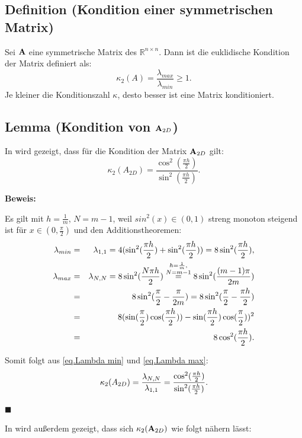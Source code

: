 \subsection{Definition (Kondition einer symmetrischen Matrix)}\label{ss.Definition Kondition einer Matrix}

Sei ${\textbf{A}}$ eine symmetrische Matrix des $\mathbb{R}^{n \times n}$. Dann ist die euklidische Kondition der Matrix definiert als:
\begin{equation}
\kappa_{2} (A) = \frac {\lambda_{max}} {\lambda_{min}} \ge 1.\label{eq.Kondition}
\end{equation}
Je kleiner die Konditionszahl $\kappa$, desto besser ist eine Matrix konditioniert.

\subsection{Lemma (Kondition von ${\textbf{A}}_{2D}$)}\label{ss.Matrixkondition}

In \cite{DR2} wird gezeigt, dass für die Kondition der Matrix ${\textbf{A}}_{2D}$ gilt:
\begin{equation}
\kappa_{2} (A_{2D}) = \frac {\cos^{2}(\frac{\pi h}{2})} {\sin^{2}(\frac{\pi h}{2})}.
\end{equation}

\textbf{Beweis:}

Es gilt mit $h = \frac{1}{m}$, $N = m - 1$, weil $sin^{2}(x) \in (0,1)$ streng monoton steigend ist für $x \in (0,\frac{\pi}{2})$ und den Additionstheoremen:
\begin{eqnarray}
\lambda_{min} &=& \lambda_{1,1} = 4 (\sin^{2}(\frac{\pi h}{2}) + \sin^{2}(\frac{\pi h}{2})) = 8\sin^{2}(\frac{\pi h}{2}),\label{eq.Lambda min}\\
\lambda_{max} &=& \lambda_{N,N} = 8\sin^{2}(\frac{N\pi h}{2}) \overset{\substack{h=\frac {1} {m}, \\N=m-1}}{=} 8\sin^{2}(\frac{(m-1)\pi}{2m}) \notag \\
&=& 8\sin^{2}(\frac{\pi}{2} - \frac{\pi}{2m}) = 8\sin^{2}(\frac{\pi}{2} - \frac{\pi h}{2}) \notag \\
&=& 8(\sin(\frac{\pi}{2})\cos(\frac{\pi h}{2})) - \sin(\frac{\pi h}{2})\cos(\frac{\pi}{2}))^{2} \notag \\
&=& 8\cos^{2}(\frac{\pi h}{2}). \label{eq.Lambda max}
\end{eqnarray}

Somit folgt aus \autoref{eq.Lambda min} und \autoref{eq.Lambda max}:
\begin{equation}
\kappa_{2} (A_{2D}) = \frac {\lambda_{N,N}} {\lambda_{1,1}} = \frac {\cos^{2} (\frac {\pi h} {2})} {\sin^{2} (\frac {\pi h} {2})}. \notag
\end{equation}
\begin{flushright}
$\blacksquare$
\end{flushright}
In \cite{DR3} wird außerdem gezeigt, dass sich $\kappa_{2}({\textbf{A}}_{2D})$ wie folgt nähern lässt:

